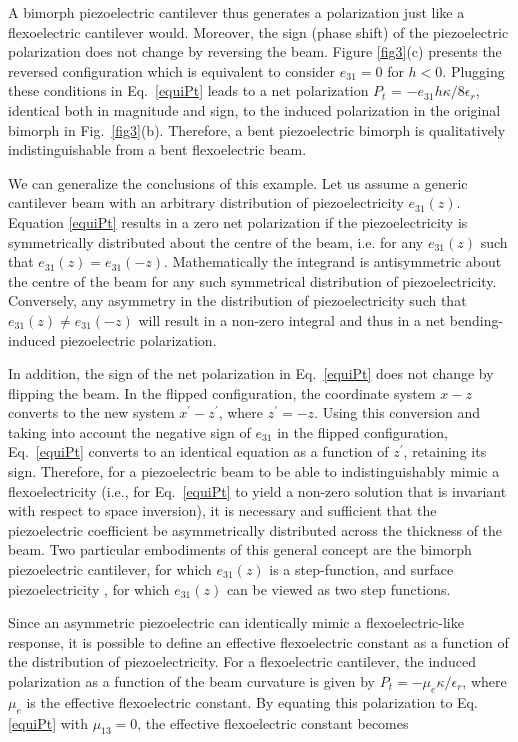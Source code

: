 \documentclass[%
 aps,prl,showpacs,
 amsmath,amssymb,
 reprint,%
]{revtex4-1}
\begin{document}
A bimorph piezoelectric cantilever thus generates a polarization just like a flexoelectric cantilever would. Moreover, the sign (phase shift) of the piezoelectric polarization 
does not change by reversing the beam. Figure \ref{fig3}(c) presents the reversed configuration which is equivalent to consider $e_{31} = 0$ for $h<0$. 
 Plugging these conditions in Eq.~\eqref{equiPt} leads to a net polarization  
$P_t$ = $- e_{31} h \kappa /8 \epsilon_r $, identical both in magnitude and sign, to the induced polarization in the original bimorph in Fig.~\ref{fig3}(b). 
Therefore, a bent piezoelectric bimorph is qualitatively indistinguishable from a bent flexoelectric beam. 


We can generalize the conclusions of this example. Let us assume a generic cantilever beam with an arbitrary distribution of piezoelectricity $e_{31}(z)$.  Equation \eqref{equiPt} results in a zero net polarization
if the piezoelectricity is symmetrically distributed about the centre of the beam, i.e. for any $e_{31}(z)$ such that $e_{31}(z) = e_{31}(-z)$. Mathematically
the integrand is antisymmetric about the centre of the beam for any such symmetrical distribution of piezoelectricity. 
Conversely, any asymmetry in the distribution of piezoelectricity such that $e_{31}(z) \ne e_{31}(-z)$ will result in a non-zero integral and thus in a net bending-induced piezoelectric polarization.

In addition, the sign of the net polarization in Eq.~\eqref{equiPt}
does not change by flipping the beam. In the flipped configuration, the coordinate system $x - z$ converts to the new system $x^\prime - z^\prime$, where $z^\prime = - z$.  Using this conversion and taking into account the negative sign of $e_{31}$ in the flipped configuration, 
Eq.~\eqref{equiPt} converts to an identical equation as a function of $z^\prime$, retaining its sign. Therefore,
for a piezoelectric beam to be able to indistinguishably mimic a flexoelectricity (i.e., for Eq.~\eqref{equiPt} to yield a non-zero solution that 
is invariant with respect to space inversion), it is necessary and sufficient that the piezoelectric coefficient be asymmetrically distributed across the thickness of the beam. Two particular embodiments of this general concept are the bimorph piezoelectric cantilever, for which $e_{31}(z)$ is a step-function, and surface piezoelectricity \cite{ref:Tagantsev2012,ref:Zubko2013,ref:Stengel2014,ref:Narvaez2015}, for which $e_{31}(z)$ can be viewed as two step functions. 

% 
Since an asymmetric piezoelectric can identically mimic a flexoelectric-like response, it is possible to define an effective flexoelectric constant as a function of the 
distribution of piezoelectricity. For a flexoelectric cantilever, the induced polarization as a function of the beam curvature is given by $P_t = - \mu_{e} \kappa / \epsilon_r $, where $\mu_{e}$ is the effective flexoelectric constant. By equating this polarization to Eq. \eqref{equiPt} with $\mu_{13} = 0$, the effective flexoelectric constant becomes 
\end{document}
